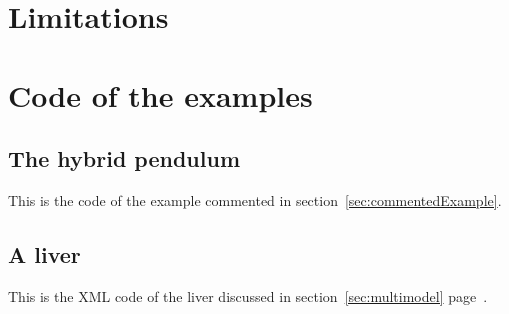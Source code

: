\section{Limitations}

\pagebreak
\appendix
\section{Code of the examples}
\subsection{The hybrid pendulum}\label{cpp:hybrid}
This is the code of the example commented in section~\ref{sec:commentedExample}.

\subsection{A liver}\label{xml:liver}
This is the XML code of the liver discussed in section~\ref{sec:multimodel} page~\pageref{bla:liver}.

% 
% 
% 
% 
% 
% 
% 








